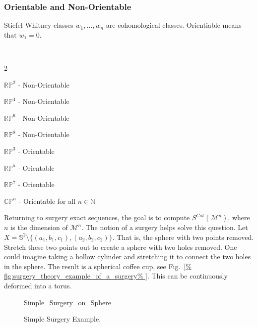 \documentclass[crop=false,class=book,oneside]{standalone}                      %
\begin{document}
        \subsubsection{Orientable and Non-Orientable}
            Stiefel-Whitney classes $w_{1},\hdots, w_{n}$ are
            cohomological classes.
            Orientiable means that $w_{1}=0$.
            \begin{example}
                \
                \begin{enumerate}
                \end{enumerate}
            \end{example}
            Returning to surgery exact sequences, the goal
            is to compute $S^{Cat}(\mathcal{M}^{n})$, where $n$
            is the dimension of $\mathcal{M}^{n}$. The notion
            of a surgery helps solve this question. Let
            $X=\mathbb{S}^{2}\setminus%
             \{(a_{1},b_{1},c_{1}),(a_{2},b_{2},c_{2})\}$.
            That is, the sphere with two points removed.
            Stretch these two points out to create a sphere
            with two holes removed. One could imagine taking
            a hollow cylinder and stretching it to connect
            the two holes in the sphere. The result is a
            spherical coffee cup, see
            Fig.~\ref{%
                fig:surgery_theory_example_of_a_surgery%
            }.
            This can be continuously deformed into a torus.
            \begin{figure}[H]
                \centering
                \captionsetup{type=figure}
                \resizebox{\textwidth}{!}
                    {{Simple_Surgery_on_Sphere}}
                \caption{Simple Surgery Example.}
                \label{fig:surgery_theory_example_of_a_surgery}
            \end{figure}
\end{document}
